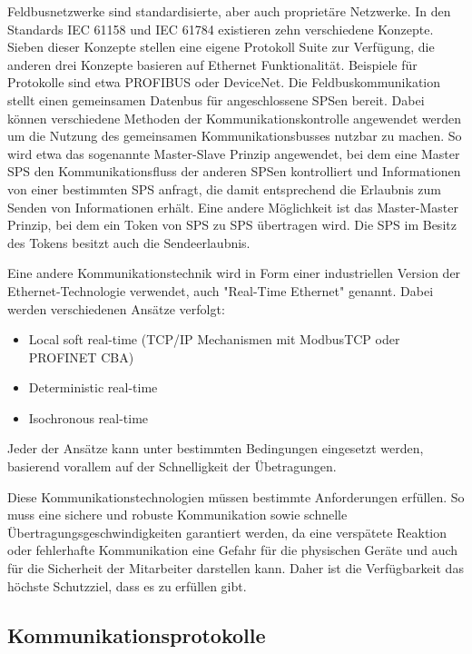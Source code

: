 Feldbusnetzwerke sind standardisierte, aber auch proprietäre Netzwerke. In den Standards IEC 61158 und IEC 61784 existieren zehn verschiedene Konzepte. Sieben dieser Konzepte stellen eine eigene Protokoll Suite zur Verfügung, die anderen drei Konzepte basieren auf Ethernet Funktionalität. Beispiele für Protokolle sind etwa PROFIBUS oder DeviceNet.
Die Feldbuskommunikation stellt einen gemeinsamen Datenbus für angeschlossene SPSen bereit. Dabei können verschiedene Methoden der Kommunikationskontrolle angewendet werden um die Nutzung des gemeinsamen Kommunikationsbusses nutzbar zu machen. So wird etwa das sogenannte Master-Slave Prinzip angewendet, bei dem eine Master SPS den Kommunikationsfluss der anderen SPSen kontrolliert und Informationen von einer bestimmten SPS anfragt, die damit entsprechend die Erlaubnis zum Senden von Informationen erhält. Eine andere Möglichkeit ist das Master-Master Prinzip, bei dem ein Token von SPS zu SPS übertragen wird. Die SPS im Besitz des Tokens besitzt auch die Sendeerlaubnis.

Eine andere Kommunikationstechnik wird in Form einer industriellen Version der Ethernet-Technologie verwendet, auch "Real-Time Ethernet" genannt. Dabei werden verschiedenen Ansätze verfolgt:
\begin{itemize}
\item Local soft real-time (TCP/IP Mechanismen mit ModbusTCP oder PROFINET CBA)
\item Deterministic real-time 
\item Isochronous real-time
\end{itemize}

Jeder der Ansätze kann unter bestimmten Bedingungen eingesetzt werden, basierend vorallem auf der Schnelligkeit der Übetragungen.

Diese Kommunikationstechnologien müssen bestimmte Anforderungen erfüllen. So muss eine sichere und robuste Kommunikation sowie schnelle Übertragungsgeschwindigkeiten garantiert werden, da eine verspätete Reaktion oder fehlerhafte Kommunikation eine Gefahr für die physischen Geräte und auch für die Sicherheit der Mitarbeiter darstellen kann. Daher ist die Verfügbarkeit das höchste Schutzziel, dass es zu erfüllen gibt.

\subsection{Kommunikationsprotokolle	}


